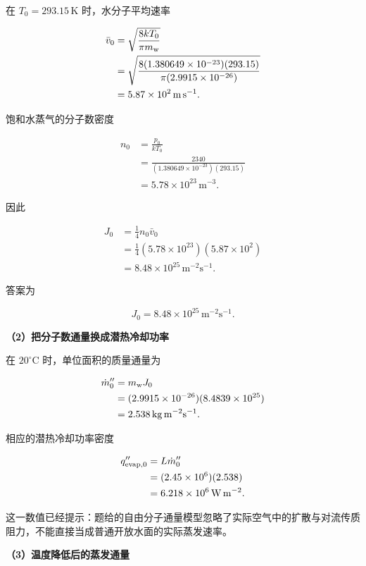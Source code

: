\documentclass[12pt,a4paper,UTF8]{ctexart}
\begin{document}
在 \(T_0=293.15\,\mathrm K\) 时，水分子平均速率

\[
\begin{aligned}
\bar v_0
&=\sqrt{\frac{8kT_0}{\pi m_{\rm w}}}\\
&=\sqrt{
\frac{8(1.380649\times10^{-23})(293.15)}
{\pi(2.9915\times10^{-26})}
}\\
&=5.87\times10^2\,\mathrm{m\,s^{-1}}.
\end{aligned}
\]

饱和水蒸气的分子数密度

\[
\begin{aligned}
n_0
&=\frac{p_0}{kT_0}\\
&=\frac{2340}
{(1.380649\times10^{-23})(293.15)}\\
&=5.78\times10^{23}\,\mathrm{m^{-3}}.
\end{aligned}
\]

因此

\[
\begin{aligned}
J_0
&=\frac14n_0\bar v_0\\
&=\frac14(5.78\times10^{23})(5.87\times10^2)\\
&=8.48\times10^{25}\,\mathrm{m^{-2}s^{-1}}.
\end{aligned}
\]

答案为

\[
\boxed{J_0=8.48\times10^{25}\,\mathrm{m^{-2}s^{-1}}}.
\]

\textbf{（2）把分子数通量换成潜热冷却功率}

在 \(20^\circ\mathrm C\) 时，单位面积的质量通量为

\[
\begin{aligned}
\dot m_0''
&=m_{\rm w}J_0\\
&=(2.9915\times10^{-26})(8.4839\times10^{25})\\
&=2.538\,\mathrm{kg\,m^{-2}s^{-1}}.
\end{aligned}
\]

相应的潜热冷却功率密度

\[
\begin{aligned}
q_{\rm evap,0}''
&=L\dot m_0''\\
&=(2.45\times10^6)(2.538)\\
&=6.218\times10^6\,\mathrm{W\,m^{-2}}.
\end{aligned}
\]

这一数值已经提示：题给的自由分子通量模型忽略了实际空气中的扩散与对流传质阻力，不能直接当成普通开放水面的实际蒸发速率。

\textbf{（3）温度降低后的蒸发通量}
\end{document}
